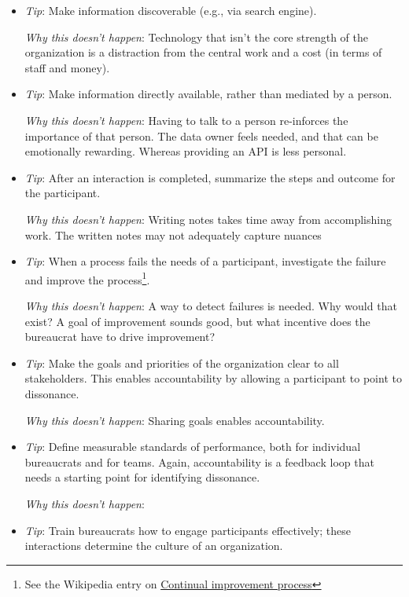 \begin{itemize}
    \item \textit{Tip}: Make information discoverable (e.g., via search engine).

    \textit{Why this doesn't happen}: Technology that isn't the core strength of the organization is a distraction from the central work and a cost (in terms of staff and money).
    
    \item \textit{Tip}: Make information directly available, rather than mediated by a person. 

    \textit{Why this doesn't happen}: Having to talk to a person re-inforces the importance of that person. The data owner feels needed, and that can be emotionally rewarding. Whereas providing an API is less personal. 
    
    \item \textit{Tip}: After an interaction is completed, summarize the steps and outcome for the participant. 

    \textit{Why this doesn't happen}: Writing notes takes time away from accomplishing work. The written notes may not adequately capture nuances
    
    \item \textit{Tip}: When a process fails the needs of a participant, investigate the failure and improve the process\footnote{See the Wikipedia entry on \href{https://en.wikipedia.org/wiki/Continual_improvement_process}{Continual improvement process}}. 

    \textit{Why this doesn't happen}: A way to detect failures is needed. Why would that exist? A goal of improvement sounds good, but what incentive does the bureaucrat have to drive improvement?
    
    \item \textit{Tip}: Make the goals and priorities of the organization clear to all stakeholders. This enables accountability by allowing a participant to point to dissonance.  

    \textit{Why this doesn't happen}: Sharing goals enables accountability. 
    
    \item \textit{Tip}: Define measurable standards of performance, both for individual bureaucrats and for teams. Again, accountability is a feedback loop that needs a starting point for identifying dissonance.

    \textit{Why this doesn't happen}: 
    
    \item \textit{Tip}: Train bureaucrats how to engage participants effectively; these interactions determine the culture of an organization. 


\end{itemize}
